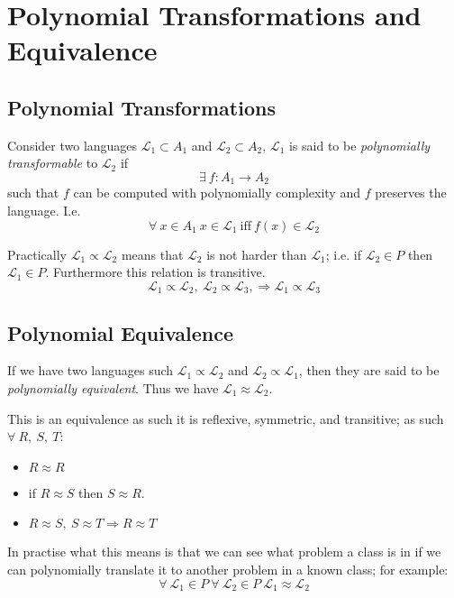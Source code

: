\section{Polynomial Transformations and Equivalence}
\subsection{Polynomial Transformations}
\begin{definition}
	Consider two languages $\mathcal{L_1} \subset A_1$ and $\mathcal{L_2} \subset A_2$,
	$\mathcal{L_1}$ is said to be \textit{polynomially transformable} to $\mathcal{L_2}$ if
	$$\exists\ f : A_1 \rightarrow A_2$$
	such that $f$ can be computed with polynomially complexity and $f$ preserves the language. I.e.
	$$\forall\ x \in A_1\ x \in \mathcal{L_1}\ \mathrm{iff}\ f(x)\in \mathcal{L_2}$$
\end{definition}

Practically $\mathcal{L_1} \propto \mathcal{L_2}$ means that
$\mathcal{L_2}$ is not harder than $\mathcal{L_1}$;
i.e. if $\mathcal{L_2} \in P$ then $\mathcal{L_1} \in P$.
Furthermore this relation is transitive.
$$
  \mathcal{L_1} \propto \mathcal{L_2},\ 
  \mathcal{L_2} \propto \mathcal{L_3},\Rightarrow
  \mathcal{L_1} \propto \mathcal{L_3}
$$

\subsection{Polynomial Equivalence}
\begin{definition}
	If we have two languages such $\mathcal{L_1} \propto \mathcal{L_2}$ and
	$\mathcal{L_2} \propto \mathcal{L_1}$, then they are said to be \textit{polynomially equivalent}.
	Thus we have $\mathcal{L_1} \approx \mathcal{L_2}$.
\end{definition}
This is an equivalence as such it is reflexive, symmetric, and transitive;
as such $\forall\ R,\ S,\ T$:
\begin{itemize}
    \item $R \approx R$
    \item if $R \approx S$ then $S \approx R$.
    \item $
		R \approx S,\ 
		S \approx T \Rightarrow
		R \approx T
	$
\end{itemize}

In practise what this means is that we can see what problem a class is in if we can
polynomially translate it to another problem in a known class; for example:
$$
  \forall\ \mathcal{L_1} \in P\ 
  \forall\ \mathcal{L_2} \in P\ 
  \mathcal{L_1} \approx \mathcal{L_2}
$$
